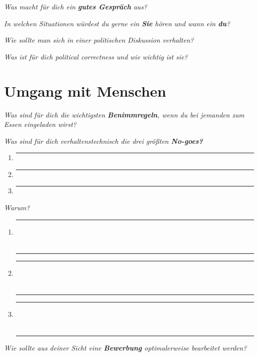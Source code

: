 \documentclass[a4paper,12pt]{scrartcl}
\newcommand{\hfilloutline}[1]{\rule{#1}{0.5pt}}
\newcommand{\frage}[1]{\textit{#1}}
\renewcommand{\emph}[1]{\textbf{#1}}
\begin{document}
\frage{Was macht für dich ein \emph{gutes Gespräch} aus?}
\vspace{4cm}

\frage{In welchen Situationen würdest du gerne ein \emph{Sie} hören und wann ein \emph{du}?}
\vspace{3cm}

\frage{Wie sollte man sich in einer politischen Diskussion verhalten?}
\vspace{7cm}

\frage{Was ist für dich political correctness und wie wichtig ist sie?}
\vspace{3cm}

\newpage

   


\section*{Umgang mit Menschen}
\frage{Was sind für dich die wichtigsten \emph{Benimmregeln}, wenn du bei jemanden zum Essen eingeladen wirst?}
\vspace{5cm}

\frage{Was sind für dich verhaltenstechnisch die drei größten \emph{No-goes?}}
\begin{enumerate}
    \item \hfill\hfilloutline{15cm}
    \item \hfill\hfilloutline{15cm}
    \item \hfill\hfilloutline{15cm}
\end{enumerate}
\frage{Warum?}
\begin{enumerate}
    \item \hfill\hfilloutline{15cm}\\ \\ \hfill\hfilloutline{15cm}
    \item \hfill\hfilloutline{15cm}\\ \\ \hfill\hfilloutline{15cm}
    \item \hfill\hfilloutline{15cm}\\ \\ \hfill\hfilloutline{15cm}
\end{enumerate}
\newpage

\frage{Wie sollte aus deiner Sicht eine \emph{Bewerbung} optimalerweise bearbeitet werden?}
\vspace{4cm}
\end{document}
